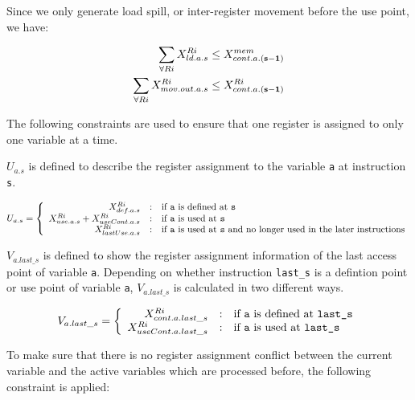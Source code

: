 Since we only generate load spill, or inter-register movement
before the use point, we have:

\begin{small}
\begin{eqnarray}
\sum_{\forall Ri}X_{ld.a.s}^{Ri} \leq X_{cont.a.{\bf(s-1)}}^{mem} \nonumber \\
\sum_{\forall Ri}X_{mov.out.a.s}^{Ri} \leq X_{cont.a.{\bf(s-1)}}^{Ri}
\end{eqnarray}
\end{small}

The following constraints are used to ensure that one register is assigned to
only one variable at a time.

$U_{a.s}$ is defined to describe the register assignment to the variable {\tt a}
at instruction {\tt s}.

\begin{small}
\begin{eqnarray}
U_{a.s} = \left\{\begin{array}{r@{\quad:\quad}l} 
X_{def.a.s}^{Ri} & \mbox{if {\tt a} is defined at {\tt s}} \\ 
X_{use.a.s}^{Ri} + X_{useCont.a.s}^{Ri} & \mbox{if {\tt a} is used at {\tt s}} \\
X_{lastUse.a.s}^{Ri} & \mbox{if {\tt a} is used at {\tt s} and no longer used in the later instructions}\end{array}\right. 
\end{eqnarray}
\end{small}

$V_{a.last\_s}$ is defined to show the register assignment information of the last access
point of variable {\tt a}. 
Depending on whether instruction {\tt last\_s} is a defintion point or use point of variable {\tt a}, 
$V_{a.last\_s}$ is calculated in two different ways.

\begin{small}
\begin{eqnarray}
V_{a.last\_s} = \left\{\begin{array}{r@{\quad:\quad}l} 
X_{cont.a.last\_s}^{Ri} & \mbox{if {\tt a} is defined at {\tt last\_s}} \\ 
X_{useCont.a.last\_s}^{Ri} &\mbox{if {\tt a} is used at {\tt last\_s}} \end{array}\right. 
\end{eqnarray}
\end{small}

To make sure that there is no register assignment conflict between the current
variable and the active variables which are processed before, the following constraint
is applied:

